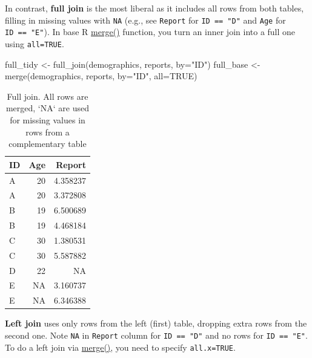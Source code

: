 \documentclass[
]{book}
\newenvironment{Shaded}{\begin{snugshade}}{\end{snugshade}}
\newcommand{\AttributeTok}[1]{\textcolor[rgb]{0.77,0.63,0.00}{#1}}
\newcommand{\ConstantTok}[1]{\textcolor[rgb]{0.00,0.00,0.00}{#1}}
\newcommand{\FunctionTok}[1]{\textcolor[rgb]{0.00,0.00,0.00}{#1}}
\newcommand{\NormalTok}[1]{#1}
\newcommand{\OtherTok}[1]{\textcolor[rgb]{0.56,0.35,0.01}{#1}}
\newcommand{\StringTok}[1]{\textcolor[rgb]{0.31,0.60,0.02}{#1}}
\begin{document}
In contrast, \textbf{full join} is the most liberal as it includes all rows from both tables, filling in missing values with \texttt{NA} (e.g., see \texttt{Report} for \texttt{ID\ ==\ "D"} and \texttt{Age} for \texttt{ID\ ==\ "E"}). In base R \href{https://stat.ethz.ch/R-manual/R-devel/library/base/html/merge.html}{merge()} function, you turn an inner join into a full one using \texttt{all=TRUE}.

\begin{Shaded}
\begin{Highlighting}[]
\NormalTok{full\_tidy }\OtherTok{\textless{}{-}} \FunctionTok{full\_join}\NormalTok{(demographics, reports, }\AttributeTok{by=}\StringTok{"ID"}\NormalTok{) }
\NormalTok{full\_base }\OtherTok{\textless{}{-}} \FunctionTok{merge}\NormalTok{(demographics, reports, }\AttributeTok{by=}\StringTok{"ID"}\NormalTok{, }\AttributeTok{all=}\ConstantTok{TRUE}\NormalTok{)}
\end{Highlighting}
\end{Shaded}

\begin{table}

\caption{\label{tab:unnamed-chunk-183}Full join. All rows are merged, `NA` are used for missing values in rows from a complementary table}
\centering
\begin{tabular}[t]{l|r|r}
\hline
ID & Age & Report\\
\hline
A & 20 & 4.358237\\
\hline
A & 20 & 3.372808\\
\hline
B & 19 & 6.500689\\
\hline
B & 19 & 4.468184\\
\hline
C & 30 & 1.380531\\
\hline
C & 30 & 5.587882\\
\hline
D & 22 & NA\\
\hline
E & NA & 3.160737\\
\hline
E & NA & 6.346388\\
\hline
\end{tabular}
\end{table}

\textbf{Left join} uses only rows from the left (first) table, dropping extra rows from the second one. Note \texttt{NA} in \texttt{Report} column for \texttt{ID\ ==\ "D"} and no rows for \texttt{ID\ ==\ "E"}. To do a left join via \href{https://stat.ethz.ch/R-manual/R-devel/library/base/html/merge.html}{merge()}, you need to specify \texttt{all.x=TRUE}.
\end{document}
